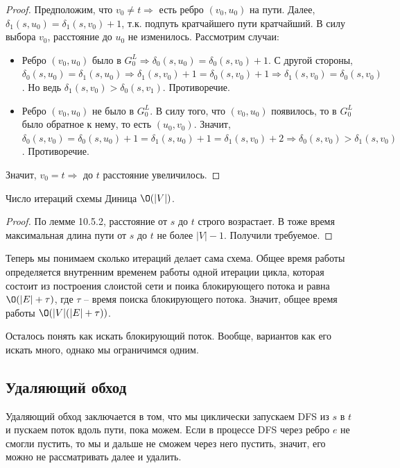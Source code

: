 \begin{proof}
    Предположим, что $v_0 \neq t \Rightarrow$ есть ребро $(v_0, u_0)$ на пути. Далее, $\delta_1(s, u_0) = \delta_1(s, v_0) + 1$, т.к. подпуть кратчайшего пути кратчайший.
    В силу выбора $v_0$, расстояние до $u_0$ не изменилось. Рассмотрим случаи:
    \begin{itemize}
        \item Ребро $(v_0, u_0)$ было в $G_0^L \Rightarrow \delta_0(s, u_0) = \delta_0(s, v_0) + 1$. 
        С другой стороны, $\delta_0(s, u_0) = \delta_1(s, u_0) \Rightarrow \delta_1(s, v_0) + 1 = \delta_0(s, v_0) + 1 \Rightarrow \delta_1(s, v_0) = \delta_0(s, v_0)$. Но ведь $\delta_1(s, v_0) > \delta_0(s, v_1)$. Противоречие.
        \item Ребро $(v_0, u_0)$ не было в $G_0^L$. В силу того, что $(v_0, u_0)$ появилось, то в $G_0^L$ было обратное к нему, то есть $(u_0, v_0)$. 
        Значит, $\delta_0(s, v_0) = \delta_0(s, u_0) + 1 = \delta_1(s, u_0) + 1 = \delta_1(s, v_0) + 2 \Rightarrow \delta_0(s, v_0) > \delta_1(s, v_0)$. Противоречие.
    \end{itemize}
    Значит, $v_0 = t \Rightarrow$ до $t$ расстояние увеличилось.

\end{proof}

\St Число итераций схемы Диница $\O(|V|)$.
\begin{proof}
    
    По лемме 10.5.2, расстояние от $s$ до $t$ строго возрастает. В тоже время максимальная длина пути от $s$ до $t$ не более $|V| - 1$. Получили требуемое.

\end{proof}

Теперь мы понимаем сколько итераций делает сама схема. 
Общее время работы определяется внутренним временем работы одной итерации цикла, которая состоит из построения слоистой сети и поика блокирующего потока и равна $\O(|E| + \tau)$, где $\tau$ -- время поиска блокирующего потока. Значит, общее время работы $\O(|V|(|E| + \tau))$.

Осталось понять как искать блокирующий поток. Вообще, вариантов как его искать много, однако мы ограничимся одним.

\subsection{Удаляющий обход}

Удаляющий обход заключается в том, что мы циклически запускаем DFS из $s$ в $t$ и пускаем поток вдоль пути, пока можем. 
Если в процессе DFS через ребро $e$ не смогли пустить, то мы и дальше не сможем через него пустить, значит, его можно не рассматривать далее и удалить.

